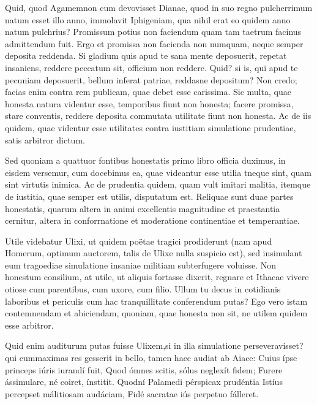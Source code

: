  Quid, quod Agamemnon cum devovisset Dianae, quod in suo regno pulcherrimum natum esset illo anno, immolavit Iphigeniam, qua nihil erat eo quidem anno natum pulchrius? Promissum potius non faciendum quam tam taetrum facinus admittendum fuit. Ergo et promissa non facienda non numquam, neque semper deposita reddenda. Si gladium quis apud te sana mente deposuerit, repetat insaniens, reddere peccatum sit, officium non reddere. Quid? si is, qui apud te pecuniam deposuerit, bellum inferat patriae, reddasne depositum? Non credo; facias enim contra rem publicam, quae debet esse carissima. Sic multa, quae honesta natura videntur esse, temporibus fiunt non honesta; facere promissa, stare conventis, reddere deposita commutata utilitate fiunt non honesta. Ac de iis quidem, quae videntur esse utilitates contra iustitiam simulatione prudentiae, satis arbitror dictum.

 Sed quoniam a quattuor fontibus honestatis primo libro officia duximus, in eisdem versemur, cum docebimus ea, quae videantur esse utilia tneque sint, quam sint virtutis inimica. Ac de prudentia quidem, quam vult imitari malitia, itemque de iustitia, quae semper est utilis, disputatum est. Reliquae sunt duae partes honestatis, quarum altera in animi excellentis magnitudine et praestantia cernitur, altera in conforrnatione et moderatione continentiae et temperantiae.

 Utile videbatur Ulixi, ut quidem poëtae tragici prodiderunt (nam apud Homerum, optimum auctorem, talis de Ulixe nulla suspicio est), sed insimulant eum tragoediae simulatione insaniae militiam subterfugere voluisse. Non honestum consilium, at utile, ut aliquis fortasse dixerit, regnare et Ithacae vivere otiose cum parentibus, cum uxore, cum filio. Ullum tu decus in cotidianis laboribus et periculis cum hac tranquillitate conferendum putas? Ego vero istam contemnendam et abiciendam, quoniam, quae honesta non sit, ne utilem quidem esse arbitror.

 Quid enim auditurum putas fuisse Ulixem,si in illa simulatione perseveravisset? qui cummaximas res gesserit in bello, tamen haec audiat ab Aiace: Cuius ípse princeps iúris iurandí fuit, Quod ómnes scitis, sólus neglexít fidem; Furere ássimulare, né coiret, ínstitit. Quodní Palamedi pérspicax prudéntia Istíus percepset málitiosam audáciam, Fidé sacratae iús perpetuo fálleret.

